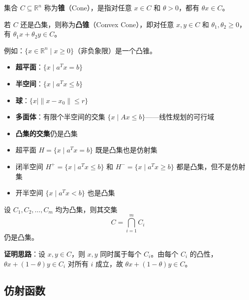 \begin{definition}[锥与凸锥]
集合 $C \subseteq \mathbb{R}^n$ 称为\textbf{锥}（Cone），是指对任意 $x \in C$ 和 $\theta > 0$，都有 $\theta x \in C$。

若 $C$ 还是凸集，则称为\textbf{凸锥}（Convex Cone），即对任意 $x, y \in C$ 和 $\theta_1, \theta_2 \geq 0$，有 $\theta_1 x + \theta_2 y \in C$。

例如：$\{x \in \mathbb{R}^n \mid x \geq 0\}$（非负象限）是一个凸锥。
\end{definition}

\begin{conceptbox}[常见凸集]
\begin{itemize}[itemsep=0.3em]
    \item \textbf{超平面}：$\{x \mid a^T x = b\}$
    \item \textbf{半空间}：$\{x \mid a^T x \leq b\}$
    \item \textbf{球}：$\{x \mid \|x - x_0\| \leq r\}$
    \item \textbf{多面体}：有限个半空间的交集 $\{x \mid Ax \leq b\}$——线性规划的可行域
    \item \textbf{凸集的交集}仍是凸集
\end{itemize}
\end{conceptbox}

\begin{property}[超平面与半空间的特征]
\begin{itemize}[itemsep=0.3em]
    \item 超平面 $H = \{x \mid a^T x = b\}$ 既是凸集也是仿射集
    \item 闭半空间 $H^+ = \{x \mid a^T x \leq b\}$ 和 $H^- = \{x \mid a^T x \geq b\}$ 都是凸集，但不是仿射集
    \item 开半空间 $\{x \mid a^T x < b\}$ 也是凸集
\end{itemize}
\end{property}

\begin{property}[凸集的交集]
设 $C_1, C_2, \ldots, C_m$ 均为凸集，则其交集
\[
C = \bigcap_{i=1}^{m} C_i
\]
仍是凸集。

\textbf{证明思路}：设 $x, y \in C$，则 $x, y$ 同时属于每个 $C_i$。由每个 $C_i$ 的凸性，$\theta x + (1-\theta)y \in C_i$ 对所有 $i$ 成立，故 $\theta x + (1-\theta)y \in C$。
\end{property}

\subsection{仿射函数}

